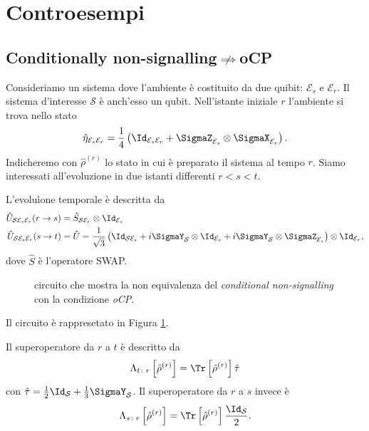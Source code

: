 \documentclass[a4]{article}
\begin{document}
\section{Controesempi}
\subsection[Cond. non-signalling does not imply oCP]
           {Conditionally non-signalling\(\centernot\implies\)oCP} \label{cont:cnsocp}
Consideriamo un sistema dove l'ambiente è costituito da due quibit: \(\mathcal{E}_s\) e
\(\mathcal{E}_r\). Il sistema d'interesse \(\mathcal{S}\) è anch'esso un qubit.
Nell'istante iniziale \(r\) l'ambiente si trova nello stato
\[\hat{\eta}_{\mathcal{E}_s\mathcal{E}_r} =
  \frac{1}{4}\left(\Id_{\mathcal{E}_s\mathcal{E}_r} +
                    \SigmaZ_{\mathcal{E}_s} \otimes \SigmaX_{\mathcal{E}_r}
             \right). \]
Indicheremo con \(\hat{\rho}^{(r)}\) lo stato in cui è preparato il sistema al tempo \(r\).
Siamo interessati all'evoluzione in due istanti differenti \(r<s<t\).

L'evoluìone temporale è descritta da
\begin{align*}
	\hat{U}_{\mathcal{S}\mathcal{E}_s\mathcal{E}_r}(r \to s) &= 
	  \hat{S}_{\mathcal{S}\mathcal{E}_r} \otimes \Id_{\mathcal{E}_s} \\
	\hat{U}_{\mathcal{S}\mathcal{E}_s\mathcal{E}_r}(s \to t) &=
	  \hat{U} = \frac{1}{\sqrt{3}}\left(\Id_{\mathcal{S}\mathcal{E}_s} +
	    	                            i \SigmaY_{\mathcal{S}} \otimes \Id_{\mathcal{E}_s} +
	    	                            i \SigmaY_{\mathcal{S}} \otimes \SigmaZ_{\mathcal{E}_s}
	    	                      \right) \otimes \Id_{\mathcal{E}_r},    	    	                              
\end{align*}
dove \(\hat{S}\) è l'operatore SWAP.
\begin{figure}
	\centering
	
	\caption{circuito che mostra la non equivalenza del \emph{conditional non-signalling}
		con la condizione \emph{oCP}.}
	\label{fig:cnsNocp}
\end{figure}
Il circuito è rappresetato in Figura \ref{fig:cnsNocp}.

Il superoperatore da \(r\) a \(t\) è descritto da 
\[\Lambda_{t\colon r} \left[\hat{\rho}^{(r)}\right] =
    \Tr\left[\hat{\rho}^{(r)}\right] \hat{\tau} \]
con \(\hat{\tau} = \frac{1}{2}\Id_\mathcal{S} + \frac{1}{3}\SigmaY_\mathcal{S}\).
Il superoperatore da \(r\) a \(s\) invece è 
\[\Lambda_{s\colon r} \left[\hat{\rho}^{(r)}\right] =
    \Tr\left[\hat{\rho}^{(r)}\right] \frac{\Id_\mathcal{S}}{2}. \]
    
\end{document}
